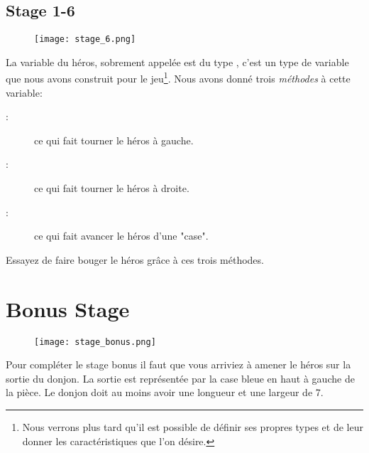 \subsection{Stage 1-6}
\begin{figure}[ht]
\texttt{[image: stage\_6.png]} 
\end{figure}

La variable du héros, sobrement appelée  est du type , c'est un type de variable que nous avons construit pour le jeu\footnote{Nous verrons plus tard qu'il est possible de définir ses propres types et de leur donner les caractéristiques que l'on désire.}. Nous avons donné trois \emph{méthodes} à cette variable:

\begin{description}
	\item[:] ce qui fait tourner le héros à gauche.
	\item[:] ce qui fait tourner le héros à droite.
	\item[:] ce qui fait avancer le héros d'une "case".
\end{description}

Essayez de faire bouger le héros grâce à ces trois méthodes.

\section{Bonus Stage}
\begin{figure}[ht]
\texttt{[image: stage\_bonus.png]} 
\end{figure}

Pour compléter le stage bonus il faut que vous arriviez à amener le héros sur la sortie du donjon. La sortie est représentée par la case bleue en haut à gauche de la pièce.
Le donjon doit au moins avoir une longueur et une largeur de 7.
